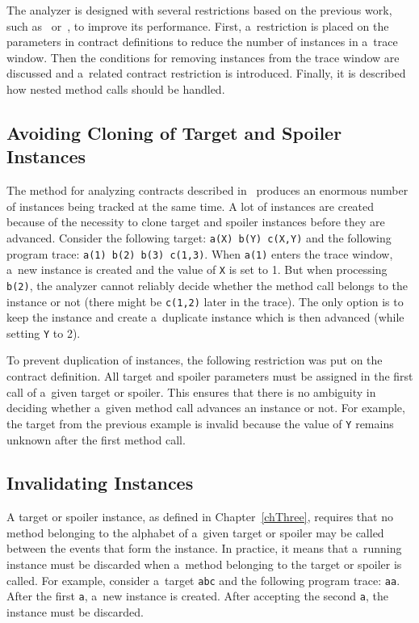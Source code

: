 The analyzer is designed with several restrictions based on the previous work,
such as~\cite{janousek} or~\cite{FITPUB10817}, to improve its performance.
First, a~restriction is placed on the parameters in contract definitions to
reduce the number of instances in a~trace window. Then the conditions for
removing instances from the trace window are discussed and a~related contract
restriction is introduced. Finally, it is described how nested method calls
should be handled.

\subsection{Avoiding Cloning of Target and Spoiler Instances}

The method for analyzing contracts described in~\cite{janousek} produces an
enormous number of instances being tracked at the same time. A lot of instances
are created because of the necessity to clone target and spoiler instances
before they are advanced. Consider the following target: \texttt{a(X) b(Y)
c(X,Y)} and the following program trace: \texttt{a(1) b(2) b(3) c(1,3)}.  When
\texttt{a(1)} enters the trace window, a~new instance is created and the value
of \texttt{X} is set to 1. But when processing \texttt{b(2)}, the analyzer
cannot reliably decide whether the method call belongs to the instance or not
(there might be \texttt{c(1,2)} later in the trace). The only option is to keep
the instance and create a~duplicate instance which is then advanced (while
setting \texttt{Y} to 2).

To prevent duplication of instances, the following restriction was put on the
contract definition. All target and spoiler parameters must be assigned in the
first call of a~given target or spoiler. This ensures that there is no ambiguity
in deciding whether a~given method call advances an instance or not. For
example, the target from the previous example is invalid because the value of
\texttt{Y} remains unknown after the first method call.

\subsection{Invalidating Instances}

A target or spoiler instance, as defined in Chapter~\ref{chThree}, requires that
no method belonging to the alphabet of a~given target or spoiler may be called
between the events that form the instance. In practice, it means that a~running
instance must be discarded when a~method belonging to the target or spoiler is
called. For example, consider a~target \texttt{abc} and the following program
trace: \texttt{aa}. After the first \texttt{a}, a~new instance is created. After
accepting the second \texttt{a}, the instance must be discarded.

